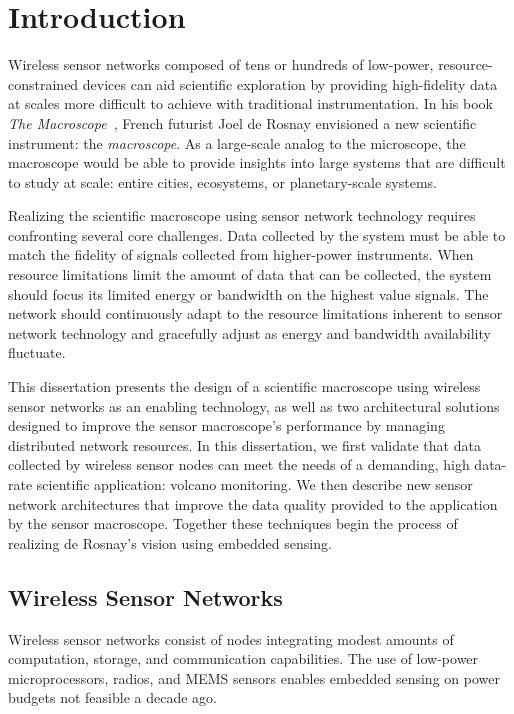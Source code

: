 \chapter{Introduction}
\label{chap-introduction}

Wireless sensor networks composed of tens or hundreds of low-power,
resource-constrained devices can aid scientific exploration by providing
high-fidelity data at scales more difficult to achieve with traditional
instrumentation. In his book \textit{The Macroscope}~\cite{rosnay79}, French
futurist Joel de Rosnay envisioned a new scientific instrument: the
\textit{macroscope}. As a large-scale analog to the microscope, the
macroscope would be able to provide insights into large systems that are
difficult to study at scale: entire cities, ecosystems, or planetary-scale
systems.

Realizing the scientific macroscope using sensor network technology requires
confronting several core challenges. Data collected by the system must be
able to match the fidelity of signals collected from higher-power
instruments. When resource limitations limit the amount of data that can be
collected, the system should focus its limited energy or bandwidth on the
highest value signals. The network should continuously adapt to the resource
limitations inherent to sensor network technology and gracefully adjust as
energy and bandwidth availability fluctuate.

This dissertation presents the design of a scientific macroscope using
wireless sensor networks as an enabling technology, as well as two
architectural solutions designed to improve the sensor macroscope's
performance by managing distributed network resources. In this dissertation,
we first validate that data collected by wireless sensor nodes can meet the
needs of a demanding, high data-rate scientific application: volcano
monitoring. We then describe new sensor network architectures that improve
the data quality provided to the application by the sensor macroscope.
Together these techniques begin the process of realizing de Rosnay's vision
using embedded sensing.

\section{Wireless Sensor Networks}

Wireless sensor networks consist of nodes integrating modest amounts of
computation, storage, and communication capabilities. The use of low-power
microprocessors, radios, and MEMS sensors enables embedded sensing on power
budgets not feasible a decade ago.

